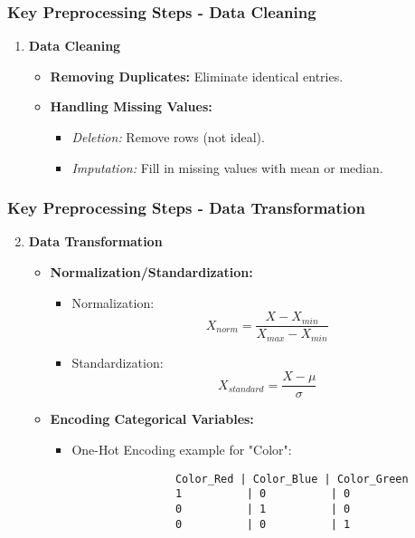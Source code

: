 \documentclass[aspectratio=169]{beamer}
\begin{document}
\begin{frame}[fragile]
    \frametitle{Key Preprocessing Steps - Data Cleaning}
    \begin{enumerate}
        \item \textbf{Data Cleaning}
        \begin{itemize}
            \item \textbf{Removing Duplicates:} Eliminate identical entries.
            \item \textbf{Handling Missing Values:}
            \begin{itemize}
                \item \textit{Deletion:} Remove rows (not ideal).
                \item \textit{Imputation:} Fill in missing values with mean or median.
            \end{itemize}
        \end{itemize}
    \end{enumerate}
\end{frame}

\begin{frame}[fragile]
    \frametitle{Key Preprocessing Steps - Data Transformation}
    \begin{enumerate}
        \setcounter{enumi}{1} %
        \item \textbf{Data Transformation}
        \begin{itemize}
            \item \textbf{Normalization/Standardization:}
            \begin{itemize}
                \item Normalization: 
                \[
                X_{norm} = \frac{X - X_{min}}{X_{max} - X_{min}}
                \]
                \item Standardization:
                \[
                X_{standard} = \frac{X - \mu}{\sigma}
                \]
            \end{itemize}
            \item \textbf{Encoding Categorical Variables:}
            \begin{itemize}
                \item One-Hot Encoding example for "Color":
                \begin{lstlisting}
                Color_Red | Color_Blue | Color_Green
                1          | 0          | 0
                0          | 1          | 0
                0          | 0          | 1
                \end{lstlisting}
            \end{itemize}
        \end{itemize}
    \end{enumerate}
\end{frame}
\end{document}
